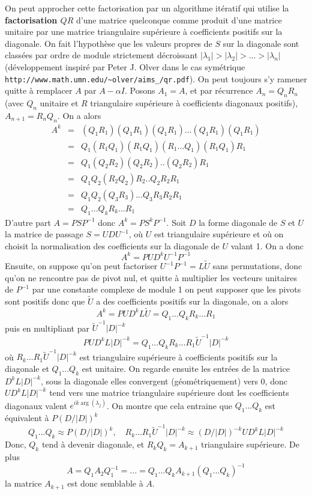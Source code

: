 \documentclass[a4paper,11pt]{article}
\begin{document}
\begin{giacjshere}
On peut approcher cette factorisation par un algorithme it\'eratif
qui utilise la {\bf factorisation $QR$} 
d'une matrice quelconque comme
produit d'une matrice unitaire par une matrice triangulaire sup\'erieure
\`a coefficients positifs sur la diagonale. On fait l'hypoth\`ese que les
valeurs propres de $S$ sur la diagonale sont class\'ees par ordre de module 
strictement d\'ecroissant $|\lambda_1|>|\lambda_2|>...>|\lambda_n|$ 
(d\'eveloppement inspir\'e par Peter J. Olver dans le cas sym\'etrique
\verb|http://www.math.umn.edu/~olver/aims_/qr.pdf|). On peut toujours
s'y ramener quitte à remplacer $A$ par $A- \alpha I$.
Posons $A_1=A$, et par r\'ecurrence $A_n=Q_nR_n$ (avec $Q_n$ unitaire et $R$
triangulaire sup\'erieure à coefficients diagonaux positifs), 
$A_{n+1}=R_nQ_n$. On a alors
\begin{eqnarray*}
 A^k  
& = & (Q_1 R_1) (Q_1 R_1) (Q_1 R_1) ... (Q_1 R_1) (Q_1 R_1) \\
& = & Q_1 (R_1 Q_1) (R_1 Q_1) (R_1 ... Q_1) (R_1 Q_1) R_1 \\
& = & Q_1 (Q_2 R_2) (Q_2 R_2) .. (Q_2 R_2) R_1 \\
& = & Q_1 Q_2 (R_2 Q_2) R_2 .. Q_2 R_2 R_1 \\
& = & Q_1 Q_2 (Q_3 R_3) ... Q_3 R_3 R_2 R_1 \\
& = & Q_1 ... Q_k R_k ...R_1
\end{eqnarray*}
D'autre part $A=PSP^{-1}$ donc $A^k = P S^k P^{-1}$. Soit $D$ la forme diagonale
de $S$ et $U$ la matrice de passage $S=UDU^{-1}$, où $U$ est triangulaire supérieure
et où on choisit la normalisation des coefficients sur la diagonale de $U$ valant 1.
On a donc 
\[ A^k = P U D^{k} U^{-1} P^{-1} \]
Ensuite, on suppose
qu'on peut factoriser $U^{-1}P^{-1}=L\tilde{U}$ sans permutations, donc
qu'on ne rencontre pas de pivot nul, et quitte \`a multiplier 
les vecteurs unitaires de $P^{-1}$ par une constante complexe de module 1
on peut supposer que les pivots sont positifs donc que $\tilde{U}$ a
des coefficients positifs sur la diagonale, on a alors
\[ A^k = P U D^k L \tilde{U} = Q_1 ... Q_k R_k ...R_1 \]
puis en multipliant par $\tilde{U}^{-1} |D|^{-k}$
\[ P U D^k L |D|^{-k} =  Q_1 ... Q_k R_k ...R_1 \tilde{U}^{-1} |D|^{-k} \]
o\`u $R_k ...R_1 \tilde{U}^{-1} |D|^{-k}$ est triangulaire sup\'erieure à coefficients positifs
sur la diagonale et $Q_1 ... Q_k$ est unitaire. On regarde ensuite les entr\'ees 
de la matrice $D^k L |D|^{-k}$, sous la diagonale elles convergent (géométriquement) vers 0,
donc $UD^k L |D|^{-k}$ tend vers une matrice triangulaire sup\'erieure
dont les coefficients diagonaux valent $e^{i k\arg(\lambda_j)}$. On montre que cela
entraine que $Q_1 ... Q_k $ est équivalent à $P(D/|D|)^k$
\[ Q_1 ... Q_k \approx P (D/|D|)^{k}, \quad  
R_k ...R_1 \tilde{U}^{-1} |D|^{-k} \approx (D/|D|)^{-k} UD^k L |D|^{-k} \]
Donc, $Q_k$ tend à devenir diagonale, et $R_k Q_k=A_{k+1}$ triangulaire supérieure. De plus
\[ A=Q_1 A_2 Q_1^{-1} = ... = Q_1 ... Q_k A_{k+1} (Q_1 ... Q_k)^{-1} \]
la matrice $A_{k+1}$ est donc semblable à $A$.


\end{giacjshere}
\end{document}
